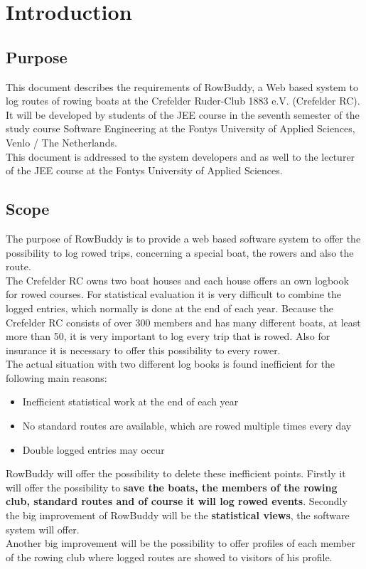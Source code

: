 \section{Introduction}

	\subsection{Purpose}
	This document describes the requirements of RowBuddy, a Web based system to log routes of rowing boats at the Crefelder Ruder-Club 1883 e.V. (Crefelder RC). It will be developed by students of the JEE course in the seventh semester of the study course Software Engineering at the Fontys University of Applied Sciences, Venlo / The Netherlands.\\
	
	This document is addressed to the system developers and as well to the lecturer of the JEE course at the Fontys University of Applied Sciences.
	
	
	\subsection{Scope}
	\label{scope}
	The purpose of RowBuddy is to provide a web based software system to offer the possibility to log rowed trips, concerning a special boat, the rowers and also the route.\\
	
	The Crefelder RC owns two boat houses and each house offers an own logbook for rowed courses. For statistical evaluation it is very difficult to combine the logged entries, which normally is done at the end of each year. Because the Crefelder RC consists of over 300 members and has many different boats, at least more than 50, it is very important to log every trip that is rowed. Also for insurance it is necessary to offer this possibility to every rower.\\
	
	The actual situation with two different log books is found inefficient for the following main reasons:
	\begin{itemize}
		\item Inefficient statistical work at the end of each year
		\item No standard routes are available, which are rowed multiple times every day
		\item Double logged entries may occur
	\end{itemize}
	
	RowBuddy will offer the possibility to delete these inefficient points. Firstly it will offer the possibility to \textbf{save the boats, the members of the rowing club, standard routes and of course it will log rowed events}. Secondly the big improvement of RowBuddy will be the \textbf{statistical views}, the software system will offer.\\
	Another big improvement will be the possibility to offer profiles of each member of the rowing club where logged routes are showed to visitors of his profile.\\
	
